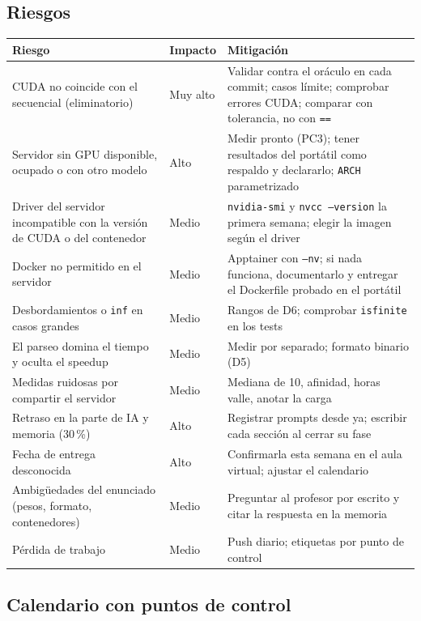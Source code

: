 \subsection{Riesgos}

{\footnotesize
\begin{xltabular}{\linewidth}{@{}>{\raggedright\arraybackslash}p{4.2cm} >{\raggedright\arraybackslash}p{1.6cm} >{\raggedright\arraybackslash}X@{}}
\toprule
Riesgo & Impacto & Mitigación \\
\midrule
\endhead
\bottomrule
\endfoot
CUDA no coincide con el secuencial (eliminatorio) & Muy alto & Validar contra el oráculo en cada commit; casos límite; comprobar errores CUDA; comparar con tolerancia, no con \texttt{==} \\
Servidor sin GPU disponible, ocupado o con otro modelo & Alto & Medir pronto (PC3); tener resultados del portátil como respaldo y declararlo; \texttt{ARCH} parametrizado \\
Driver del servidor incompatible con la versión de CUDA o del contenedor & Medio & \texttt{nvidia-smi} y \texttt{nvcc --version} la primera semana; elegir la imagen según el driver \\
Docker no permitido en el servidor & Medio & Apptainer con \texttt{--nv}; si nada funciona, documentarlo y entregar el Dockerfile probado en el portátil \\
Desbordamientos o \texttt{inf} en casos grandes & Medio & Rangos de D6; comprobar \texttt{isfinite} en los tests \\
El parseo domina el tiempo y oculta el speedup & Medio & Medir por separado; formato binario (D5) \\
Medidas ruidosas por compartir el servidor & Medio & Mediana de 10, afinidad, horas valle, anotar la carga \\
Retraso en la parte de IA y memoria (30\,\%) & Alto & Registrar prompts desde ya; escribir cada sección al cerrar su fase \\
Fecha de entrega desconocida & Alto & Confirmarla esta semana en el aula virtual; ajustar el calendario \\
Ambigüedades del enunciado (pesos, formato, contenedores) & Medio & Preguntar al profesor por escrito y citar la respuesta en la memoria \\
Pérdida de trabajo & Medio & Push diario; etiquetas por punto de control \\
\end{xltabular}
}

\subsection{Calendario con puntos de control}

